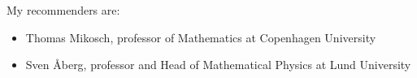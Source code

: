 \documentclass[12pt]{article}
\begin{document}
\maketitle

My recommenders are:
\begin{itemize}
\item Thomas Mikosch, professor of Mathematics at Copenhagen University
\item Sven \AA berg, professor and Head of Mathematical Physics at
  Lund University
\end{itemize}
\end{document}
